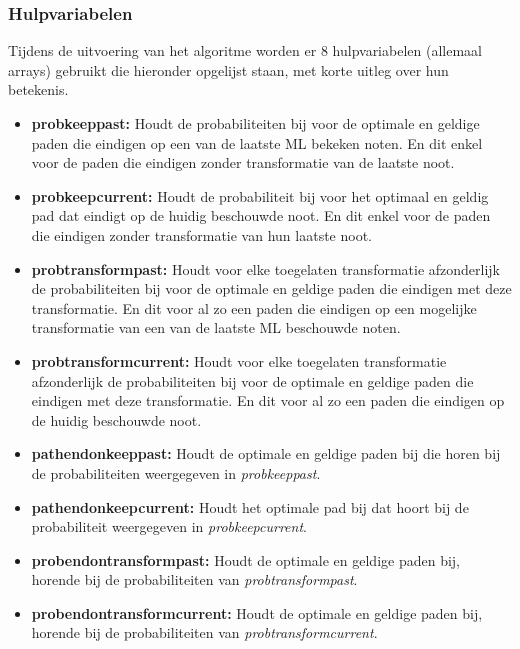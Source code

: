 \subsubsection{Hulpvariabelen}
Tijdens de uitvoering van het algoritme worden er 8 hulpvariabelen (allemaal arrays) gebruikt die hieronder opgelijst staan, met korte uitleg over hun betekenis.

\begin{itemize}
    \item \textbf{prob\textunderscore keep\textunderscore past:} Houdt de probabiliteiten bij voor de optimale 	en geldige paden die eindigen op een van de laatste ML bekeken noten. En dit 		enkel voor de paden die eindigen zonder transformatie van de laatste noot.
    \item \textbf{prob\textunderscore keep\textunderscore current:} Houdt de probabiliteit bij voor het optimaal en geldig pad dat eindigt op de huidig beschouwde noot. En dit enkel voor de paden die eindigen zonder transformatie van hun laatste noot.
    \item \textbf{prob\textunderscore transform\textunderscore past:} Houdt voor elke toegelaten transformatie afzonderlijk de probabiliteiten bij voor de optimale en geldige paden die eindigen met deze transformatie. En dit voor al zo een paden die eindigen op een mogelijke transformatie van een van de laatste ML beschouwde noten.
    \item \textbf{prob\textunderscore transform\textunderscore current:} Houdt voor elke toegelaten transformatie afzonderlijk de probabiliteiten bij voor de optimale en geldige paden die eindigen met deze transformatie. En dit voor al zo een paden die eindigen op de huidig beschouwde noot.
    \item \textbf{path\textunderscore end\textunderscore on\textunderscore keep\textunderscore past:} Houdt de optimale en geldige paden bij die horen bij de probabiliteiten weergegeven in \textit{prob\textunderscore keep\textunderscore past}.
    \item \textbf{path\textunderscore end\textunderscore on\textunderscore keep\textunderscore current:} Houdt het optimale pad bij dat hoort bij de probabiliteit weergegeven in \textit{prob\textunderscore keep\textunderscore current}.
    \item \textbf{prob\textunderscore end\textunderscore on\textunderscore transform\textunderscore past:} Houdt de optimale en geldige paden bij, horende bij de probabiliteiten van \textit{prob\textunderscore transform\textunderscore past}.
    \item \textbf{prob\textunderscore end\textunderscore on\textunderscore transform\textunderscore current:} Houdt de optimale en geldige paden bij, horende bij de probabiliteiten van \textit{prob\textunderscore transform\textunderscore current}.
\end{itemize}

